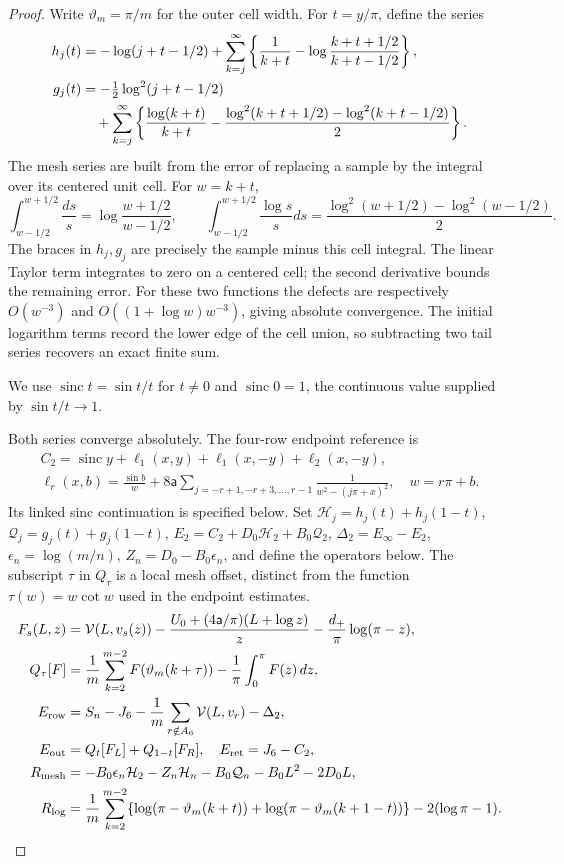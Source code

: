 \begin{proof}
Write $\vartheta_m=\pi/m$ for the outer cell width. For $t=y/\pi$, define the series
\begin{align}\label{uc:mesh-series}
 h_j(t)&=-\log(j+t-1/2)+\sum_{k=j}^\infty
 \left\{\frac1{k+t}-\log\frac{k+t+1/2}{k+t-1/2}\right\},\notag\\
 g_j(t)&=-\tfrac12\log^2(j+t-1/2)\notag\\
 &\quad+\sum_{k=j}^\infty
 \left\{\frac{\log(k+t)}{k+t}
       -\frac{\log^2(k+t+1/2)-\log^2(k+t-1/2)}2\right\}.
\end{align}
The mesh series are built from the error of replacing a sample by
the integral over its centered unit cell. For $w=k+t$,
\[
 \int_{w-1/2}^{w+1/2}\frac{ds}{s}
   =\log\frac{w+1/2}{w-1/2},\qquad
 \int_{w-1/2}^{w+1/2}\frac{\log s}{s}ds
   =\frac{\log^2(w+1/2)-\log^2(w-1/2)}2.
\]
The braces in $h_j,g_j$ are precisely the sample minus this cell
integral. The linear Taylor term integrates to zero on a centered cell;
the second derivative bounds the remaining error. For these two
functions the defects are respectively $O(w^{-3})$ and
$O((1+\log w)w^{-3})$, giving absolute convergence. The initial
logarithm terms record the lower edge of the cell union, so subtracting
two tail series recovers an exact finite sum.

We use $\operatorname{sinc}t=\sin t/t$ for $t\ne0$ and
$\operatorname{sinc}0=1$, the continuous value supplied by
$\sin t/t\to1$.

Both series converge absolutely. The four-row endpoint reference is
\[
 \begin{gathered}
 C_2=\operatorname{sinc}y+\ell_1(x,y)+\ell_1(x,-y)+\ell_2(x,-y),
 \\ \ell_r(x,b)=\frac{\sin b}{w}
   +8\mathsf{a}\sum_{j=-r+1,-r+3,\ldots,r-1}\frac1{w^2-(j\pi+x)^2},
 \quad w=r\pi+b.
 \end{gathered}
\]
Its linked sinc continuation is specified below. Set
$\mathcal H_j=h_j(t)+h_j(1-t)$, $\mathcal Q_j=g_j(t)+g_j(1-t)$,
$E_2=C_2+D_0\mathcal H_2+B_0\mathcal Q_2$,
$\Delta_2=E_\infty-E_2$, $\epsilon_n=\log(m/n)$,
$Z_n=D_0-B_0\epsilon_n$, and define the operators below.
The subscript $\tau$ in $Q_\tau$ is a local mesh offset, distinct from
the function $\tau(w)=w\cot w$ used in the endpoint estimates.
\begin{align*}
 F_s(L,z)&=\mathcal{V}(L,v_s(z))-
 \frac{U_0+(4\mathsf{a}/\pi)(L+\log z)}z-\frac{d_+}\pi\log(\pi-z),\\
 Q_\tau[F]&=\frac1m\sum_{k=2}^{m-2}F(\vartheta_m(k+\tau))
                      -\frac1\pi\int_0^\pi F(z)\,dz,\\
  E_{\rm row}&=S_n-J_6-\frac1m\sum_{r\notin A_6}\mathcal{V}(L,v_r)-\Delta_2,\\
  E_{\rm out}&=Q_t[F_L]+Q_{1-t}[F_R],\quad E_{\rm ret}=J_6-C_2,\\
 R_{\rm mesh}&=-B_0\epsilon_n\mathcal H_2-Z_n\mathcal H_n
               -B_0\mathcal Q_n-B_0L^2-2D_0L,\\
 R_{\log}&=\frac1m\sum_{k=2}^{m-2}
 \{\log(\pi-\vartheta_m(k+t))+\log(\pi-\vartheta_m(k+1-t))\}-2(\log\pi-1).
\end{align*}

\end{proof}

